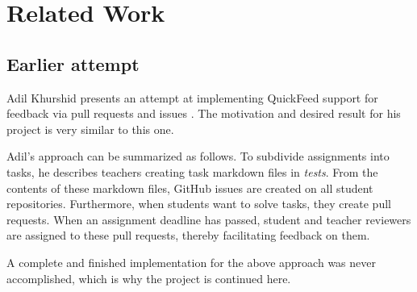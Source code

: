 
\chapter{Related Work}
\label{ch:related}

\section{Earlier attempt}

Adil Khurshid presents an attempt at implementing QuickFeed support for feedback via pull requests and issues \cite{adil}.
The motivation and desired result for his project is very similar to this one.

Adil's approach can be summarized as follows.
To subdivide assignments into tasks, he describes teachers creating task markdown files in \textit{tests}.
From the contents of these markdown files, GitHub issues are created on all student repositories.
Furthermore, when students want to solve tasks, they create pull requests.
When an assignment deadline has passed, student and teacher reviewers are assigned to these pull requests, thereby facilitating feedback on them.

A complete and finished implementation for the above approach was never accomplished, which is why the project is continued here.
